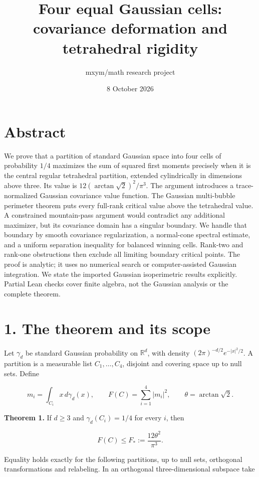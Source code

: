 \documentclass[
  11pt,
]{article}
\title{Four equal Gaussian cells: covariance deformation and tetrahedral
rigidity}
\author{mxym/math research project}
\date{8 October 2026}
\begin{document}
\maketitle

\section{Abstract}\label{abstract}

We prove that a partition of standard Gaussian space into four cells of
probability \(1/4\) maximizes the sum of squared first moments precisely
when it is the central regular tetrahedral partition, extended
cylindrically in dimensions above three. Its value is
\(12(\arctan\sqrt2)^2/\pi^3\). The argument introduces a
trace-normalized Gaussian covariance value function. The Gaussian
multi-bubble perimeter theorem puts every full-rank critical value above
the tetrahedral value. A constrained mountain-pass argument would
contradict any additional maximizer, but its covariance domain has a
singular boundary. We handle that boundary by smooth covariance
regularization, a normal-cone spectral estimate, and a uniform
separation inequality for balanced winning cells. Rank-two and rank-one
obstructions then exclude all limiting boundary critical points. The
proof is analytic; it uses no numerical search or computer-assisted
Gaussian integration. We state the imported Gaussian isoperimetric
results explicitly. Partial Lean checks cover finite algebra, not the
Gaussian analysis or the complete theorem.

\section{1. The theorem and its scope}\label{the-theorem-and-its-scope}

Let \(\gamma_d\) be standard Gaussian probability on \(\mathbb R^d\),
with density \((2\pi)^{-d/2}e^{-|x|^2/2}\). A partition is a measurable
list \(C_1,\ldots,C_4\), disjoint and covering space up to null sets.
Define

\[
 m_i=\int_{C_i}x\,d\gamma_d(x),\qquad F(C)=\sum_{i=1}^4|m_i|^2,
 \qquad \theta=\arctan\sqrt2.
\]

\textbf{Theorem 1.} If \(d\ge3\) and \(\gamma_d(C_i)=1/4\) for every
\(i\), then

\[
 F(C)\le F_*:=\frac{12\theta^2}{\pi^3}.                 \tag{1}
\]

Equality holds exactly for the following partitions, up to null sets,
orthogonal transformations and relabeling. In an orthogonal
three-dimensional subspace take
\end{document}
